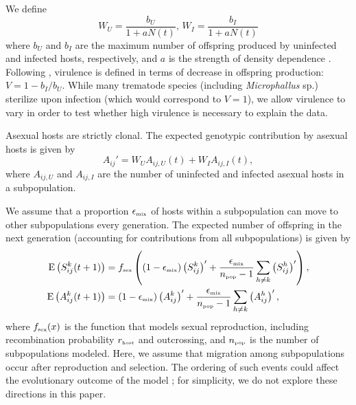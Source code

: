 \documentclass{article}\usepackage[]{graphicx}\usepackage[]{color}
\begin{document}
We define
$$
W_U = \frac{b_U}{1 + a N(t)},\,  W_I = \frac{b_I}{1 + a N(t)}
$$
where $b_U$ and $b_I$ are the maximum number of offspring produced by uninfected and infected hosts, respectively, and $a$ is the strength of density dependence \citep{smith1973stability, lively2010epidemiological}.
Following \cite{lively2010epidemiological}, virulence is defined in terms of decrease in offspring production: $V = 1- b_I/b_U$.
While many trematode species (including \textit{Microphallus} sp.) sterilize upon 
infection (which would correspond to $V = 1$), we allow virulence to vary
in order to test whether high virulence is necessary to explain the data.

Asexual hosts are strictly clonal.
The expected genotypic contribution by asexual hosts is given by
\begin{equation}
A_{ij}' = W_U A_{ij,U} (t) + W_I A_{ij,I} (t),
\end{equation}
where $A_{ij, U}$ and $A_{ij,I}$ are the number of uninfected and infected asexual hosts in a subpopulation.

We assume that a proportion $\epsilon_{\textrm{\tiny mix}}$ of hosts within a subpopulation can move to other subpopulations every generation. 
The expected number of offspring in the next generation (accounting for contributions from all subpopulations) is given by
\begin{equation}
\begin{aligned}
\mathrm{E}\left(S_{ij}^k(t+1)\right) &= f_{\textrm{\tiny sex}}\left((1 - \epsilon_{\textrm{\tiny mix}}) \left(S_{ij}^k\right)' + \frac{\epsilon_{\textrm{\tiny mix}}}{n_{\textrm{\tiny pop}}-1} \sum_{h \neq k} \left(S_{ij}^h\right)'\right),\\
\mathrm{E}\left(A_{ij}^k(t+1)\right) &= (1 - \epsilon_{\textrm{\tiny mix}}) \left(A_{ij}^k\right)' + \frac{\epsilon_{\textrm{\tiny mix}}}{n_{\textrm{\tiny pop}}-1} \sum_{h \neq k} \left(A_{ij}^h\right)',\\
\end{aligned}
\end{equation}
where $f_{\textrm{\tiny sex}}(x)$ is the function that models sexual reproduction, including recombination probability $r_{\textrm{\tiny host}}$ and outcrossing, and $n_{\textrm{\tiny pop}}$ is the number of subpopulations modeled.
Here, we assume that migration among subpopulations occur after reproduction and selection. 
The ordering of such events could affect the evolutionary outcome of the model \citep{mani1989evolution, michalakis1996interaction, massol2015evolution};
for simplicity, we do not explore these directions in this paper.
\end{document}
